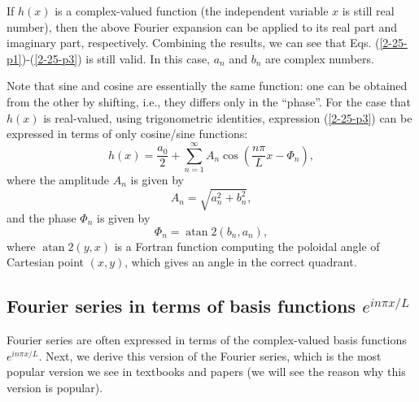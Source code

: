 \documentclass{article}
\newcommand{\tmop}[1]{\ensuremath{\operatorname{#1}}}
\begin{document}
If $h (x)$ is a complex-valued function (the independent variable $x$ is still
real number), then the above Fourier expansion can be applied to its real part
and imaginary part, respectively. Combining the results, we can see that Eqs.
(\ref{2-25-p1})-(\ref{2-25-p3}) is still valid. In this case, $a_n$ and $b_n$
are complex numbers.

Note that sine and cosine are essentially the same function: one can be
obtained from the other by shifting, i.e., they differs only in the ``phase''.
For the case that $h (x)$ is real-valued, using trigonometric identities,
expression (\ref{2-25-p3}) can be expressed in terms of only cosine/sine
functions:
\begin{equation}
  h (x) = \frac{a_0}{2} + \sum_{n = 1}^{\infty} A_n \cos \left( \frac{n
  \pi}{L} x - \Phi_n \right),
\end{equation}
where the amplitude $A_n$ is given by
\begin{equation}
  \label{20-12-16-a1} A_n = \sqrt{a_n^2 + b_n^2},
\end{equation}
and the phase $\Phi_n$ is given by
\begin{equation}
  \label{20-12-19-a1} \Phi_n = \tmop{atan} 2 (b_n, a_n),
\end{equation}
where $\tmop{atan} 2 (y, x)$ is a Fortran function computing the poloidal
angle of Cartesian point $(x, y)$, which gives an angle in the correct
quadrant.

\subsection{Fourier series in terms of basis functions $e^{i n \pi x / L}$}

Fourier series are often expressed in terms of the complex-valued basis
functions $e^{i n \pi x / L}$. Next, we derive this version of the Fourier
series, which is the most popular version we see in textbooks and papers (we
will see the reason why this version is popular).
\end{document}
